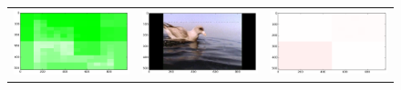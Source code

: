 \begin{figure}[h!tb]
\begin{minipage}{1.3\textwidth}
\begin{tabular}{ccc}
\includegraphics[keepaspectratio=true,width=\segwidth]{images/segment/401_10__animals__.png} &
\includegraphics[keepaspectratio=true,width=\segwidth]{images/segment/401_10__image__.png} &
\includegraphics[keepaspectratio=true,width=\segwidth]{images/segment/401_10__plastic__.png} \\


\end{tabular}
\end{minipage}
\end{figure}
